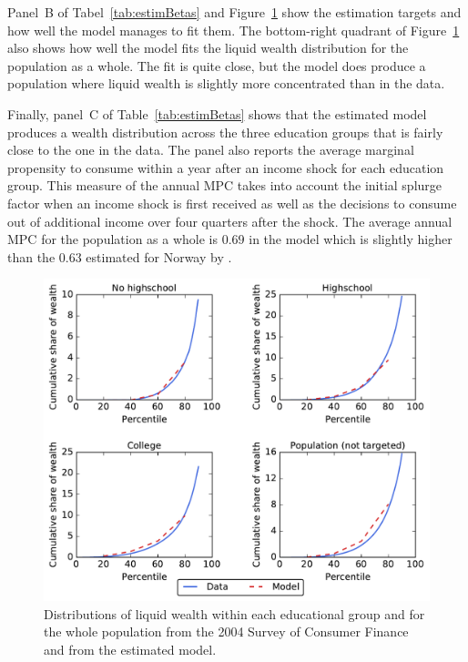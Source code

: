 \documentclass[../HAFiscal]{subfiles}
\begin{document}

Panel~B of Tabel~\ref{tab:estimBetas} and Figure~\ref{fig:LorenzPts} show the estimation targets and how well the model manages to fit them. The bottom-right quadrant of Figure~\ref{fig:LorenzPts} also shows how well the model fits the liquid wealth distribution for the population as a whole. The fit is quite close, but the model does produce a population where liquid wealth is slightly more concentrated than in the data. 

Finally, panel~C of Table~\ref{tab:estimBetas} shows that the estimated model produces a wealth distribution across the three education groups that is fairly close to the one in the data. The panel also reports the average marginal propensity to consume within a year after an income shock for each education group. This measure of the annual MPC takes into account the initial splurge factor when an income shock is first received as well as the decisions to consume out of additional income over four quarters after the shock. The average annual MPC for the population as a whole is $0.69$ in the model which is slightly higher than the $0.63$ estimated for Norway by \cite{fagereng_mpc_2021}. 

\begin{figure}[th]
\begin{center}
	\includegraphics[width=.9\textwidth]{../Figures/LorenzPoints.pdf}
	\caption{Distributions of liquid wealth within each educational group and for the whole population from the 2004 Survey of Consumer Finance and from the estimated model.}
	\label{fig:LorenzPts}
\end{center}
\end{figure}
\end{document}
